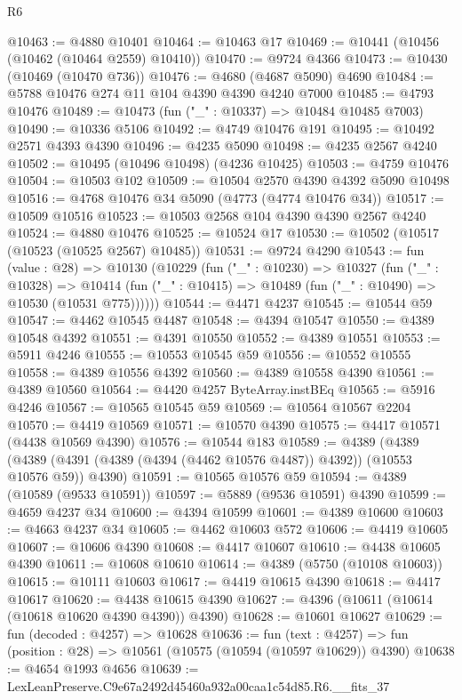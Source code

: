 \begin{lexlean}{R6}
\begin{coremodule}
@10463 := @4880 @10401
@10464 := @10463 @17
@10469 := @10441 (@10456 (@10462 (@10464 @2559) @10410))
@10470 := @9724 @4366
@10473 := @10430 (@10469 (@10470 @736))
@10476 := @4680 (@4687 @5090) @4690
@10484 := @5788 @10476 @274 @11 @104 @4390 @4390 @4240 @7000
@10485 := @4793 @10476
@10489 := @10473 (fun ("_" : @10337) => @10484 @10485 @7003)
@10490 := @10336 @5106
@10492 := @4749 @10476 @191
@10495 := @10492 @2571 @4393 @4390
@10496 := @4235 @5090
@10498 := @4235 @2567 @4240
@10502 := @10495 (@10496 @10498) (@4236 @10425)
@10503 := @4759 @10476
@10504 := @10503 @102
@10509 := @10504 @2570 @4390 @4392 @5090 @10498
@10516 := @4768 @10476 @34 @5090 (@4773 (@4774 @10476 @34))
@10517 := @10509 @10516
@10523 := @10503 @2568 @104 @4390 @4390 @2567 @4240
@10524 := @4880 @10476
@10525 := @10524 @17
@10530 := @10502 (@10517 (@10523 (@10525 @2567) @10485))
@10531 := @9724 @4290
@10543 := fun (value : @28) =>
  @10130
    (@10229
      (fun ("_" : @10230) =>
      @10327
        (fun ("_" : @10328) =>
        @10414 (fun ("_" : @10415) => @10489 (fun ("_" : @10490) => @10530 (@10531 @775))))))
@10544 := @4471 @4237
@10545 := @10544 @59
@10547 := @4462 @10545 @4487
@10548 := @4394 @10547
@10550 := @4389 @10548 @4392
@10551 := @4391 @10550
@10552 := @4389 @10551
@10553 := @5911 @4246
@10555 := @10553 @10545 @59
@10556 := @10552 @10555
@10558 := @4389 @10556 @4392
@10560 := @4389 @10558 @4390
@10561 := @4389 @10560
@10564 := @4420 @4257 ByteArray.instBEq
@10565 := @5916 @4246
@10567 := @10565 @10545 @59
@10569 := @10564 @10567 @2204
@10570 := @4419 @10569
@10571 := @10570 @4390
@10575 := @4417 @10571 (@4438 @10569 @4390)
@10576 := @10544 @183
@10589 := @4389
    (@4389 (@4389 (@4391 (@4389 (@4394 (@4462 @10576 @4487)) @4392)) (@10553 @10576 @59)) @4390)
@10591 := @10565 @10576 @59
@10594 := @4389 (@10589 (@9533 @10591))
@10597 := @5889 (@9536 @10591) @4390
@10599 := @4659 @4237 @34
@10600 := @4394 @10599
@10601 := @4389 @10600
@10603 := @4663 @4237 @34
@10605 := @4462 @10603 @572
@10606 := @4419 @10605
@10607 := @10606 @4390
@10608 := @4417 @10607
@10610 := @4438 @10605 @4390
@10611 := @10608 @10610
@10614 := @4389 (@5750 (@10108 @10603))
@10615 := @10111 @10603
@10617 := @4419 @10615 @4390
@10618 := @4417 @10617
@10620 := @4438 @10615 @4390
@10627 := @4396 (@10611 (@10614 (@10618 @10620 @4390 @4390)) @4390)
@10628 := @10601 @10627
@10629 := fun (decoded : @4257) => @10628
@10636 := fun (text : @4257) =>
  fun (position : @28) => @10561 (@10575 (@10594 (@10597 @10629)) @4390)
@10638 := @4654 @1993 @4656
@10639 := LexLeanPreserve.C9e67a2492d45460a932a00caa1c54d85.R6.__fits_37

\end{coremodule}
\end{lexlean}

